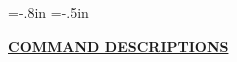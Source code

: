 \title{}
\author{}
\addtolength{\textwidth}{1.5in}
\addtolength{\textheight}{1in}
\hoffset=-.8in
\voffset=-.5in
\setlength{\parindent}{0in}

\pagestyle{empty}

\begin{center}
\Large\bf
\underline{COMMAND DESCRIPTIONS}
\end{center}
\vspace{.3in}

